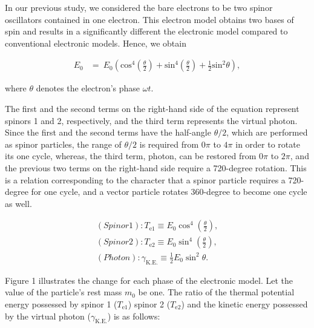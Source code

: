 \documentclass[reprint,amsmath,amssymb,aps,]{revtex4-1}
\numberwithin{equation}{section}%
\begin{document}
    In our previous study\cite{Hanamura}, we considered the bare electrons to be two spinor oscillators contained in one electron. This electron model obtains two bases of spin and results in a significantly different the electronic model compared to conventional electronic models. Hence, we obtain

        \begin{equation}
            \begin{split}
                E_{0}
                    &= \ E_{0} \left( \mathrm{cos}^{4} \left( \frac{\theta}{2} \right) + \mathrm{sin}^{4} \left( \frac{\theta}{2} \right) + \frac{1}{2} \mathrm{sin}^{2} \theta \right)
                    ,
            \end{split}
            \label{e_E=E1+E2+gamma}
        \end{equation}

    \noindent
    where $\theta$ denotes the electron's phase $\omega t$.
    
    The first and the second terms on the right-hand side of the equation represent spinors 1 and 2, respectively, and the third term represents the virtual photon. Since the first and the second terms have the half-angle $\theta / 2$, which are performed as spinor particles, the range of $\theta / 2$ is required from $0\pi$ to $4\pi$ in order to rotate its one cycle, whereas, the third term, photon, can be restored from $0\pi$ to $2\pi$, and the previous two terms on the right-hand side require a 720-degree rotation. This is a relation corresponding to the character that a spinor particle requires a 720-degree for one cycle, and a vector particle rotates 360-degree to become one cycle as well.

        \begin{equation}
            \begin{split}
                (Spinor 1): T_{\mathrm{e1}} \equiv E_{0} \cos^{4}{\left( \frac{\theta}{2} \right)}, \\
                (Spinor 2): T_{\mathrm{e2}} \equiv E_{0} \sin^{4}{\left( \frac{\theta}{2} \right)}, \\
                (Photon): \gamma_{\mathrm{K.E.}} \equiv \frac{1}{2} E_{0} \sin^{2}{\theta}.
                \end{split}
            \label{e_S1_S2_P}
        \end{equation}

    Figure 1 illustrates the change for each phase of the electronic model. Let the value of the particle's rest mass $m_{0}$ be one. The ratio of the thermal potential energy possessed by spinor 1 ($T_{\mathrm{e1}}$) spinor 2 ($T_{\mathrm{e2}}$) and the kinetic energy possessed by the virtual photon ($\gamma_{\mathrm{K.E.}}$) is as follows:
\end{document}
